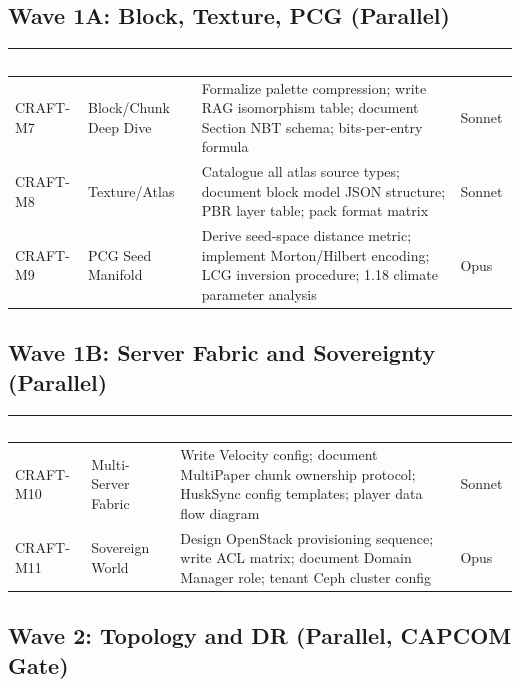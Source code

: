 \documentclass[11pt,letterpaper]{article}
\newcommand{\tableheader}[1]{\textbf{\sffamily\textcolor{white}{#1}}}
\begin{document}
\subsection{Wave 1A: Block, Texture, PCG (Parallel)}

\begin{center}
\begin{tabularx}{\textwidth}{L{1.5cm}L{2.5cm}XL{2cm}}
\toprule
{}
\tableheader{Agent} & \tableheader{Module} & \tableheader{Primary Task} & \tableheader{Model} \\
\midrule
CRAFT-M7 & Block/Chunk Deep Dive & Formalize palette compression; write RAG isomorphism table; document Section NBT schema; bits-per-entry formula & Sonnet \\
CRAFT-M8 & Texture/Atlas & Catalogue all atlas source types; document block model JSON structure; PBR layer table; pack format matrix & Sonnet \\
CRAFT-M9 & PCG Seed Manifold & Derive seed-space distance metric; implement Morton/Hilbert encoding; LCG inversion procedure; 1.18 climate parameter analysis & Opus \\
\bottomrule
\end{tabularx}
\end{center}

\subsection{Wave 1B: Server Fabric and Sovereignty (Parallel)}

\begin{center}
\begin{tabularx}{\textwidth}{L{1.5cm}L{2.5cm}XL{2cm}}
\toprule
{}
\tableheader{Agent} & \tableheader{Module} & \tableheader{Primary Task} & \tableheader{Model} \\
\midrule
CRAFT-M10 & Multi-Server Fabric & Write Velocity config; document MultiPaper chunk ownership protocol; HuskSync config templates; player data flow diagram & Sonnet \\
CRAFT-M11 & Sovereign World & Design OpenStack provisioning sequence; write ACL matrix; document Domain Manager role; tenant Ceph cluster config & Opus \\
\bottomrule
\end{tabularx}
\end{center}

\subsection{Wave 2: Topology and DR (Parallel, CAPCOM Gate)}
\end{document}
